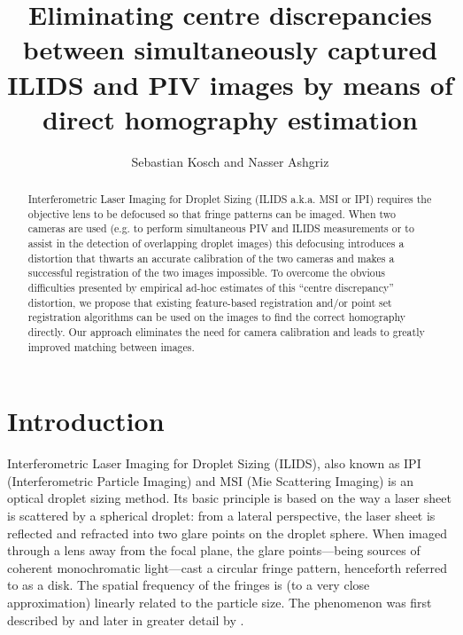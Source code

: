 \documentclass[floatfix,aip,rsi,reprint,graphicx]{revtex4-1}
\begin{document}
 \title{Eliminating centre discrepancies
between simultaneously captured ILIDS and PIV images by means of direct
homography estimation} \author{Sebastian Kosch and Nasser
Ashgriz}  
    \begin{abstract} Interferometric Laser Imaging for Droplet Sizing (ILIDS
        a.k.a. MSI or IPI) requires the objective lens to be defocused so that
        fringe patterns can be imaged. When two cameras are used (e.g. to
        perform simultaneous PIV and ILIDS measurements or to assist in the
        detection of overlapping droplet images) this defocusing introduces a
        distortion that thwarts an accurate calibration of the two cameras
        and makes a successful registration of the two images impossible. To
        overcome the obvious difficulties presented by empirical ad-hoc
        estimates of this ``centre discrepancy'' distortion, we propose that
        existing feature-based registration and/or point set registration
        algorithms can be used on the images to find the correct homography
        directly. Our approach eliminates the need for camera calibration and
        leads to greatly improved matching between images.
\end{abstract} \maketitle

\section{Introduction} Interferometric Laser Imaging for Droplet Sizing (ILIDS),
also known as IPI (Interferometric Particle Imaging) and MSI (Mie Scattering
Imaging) is an optical droplet sizing method. Its basic principle is based on
the way a laser sheet is scattered by a spherical droplet: from a lateral
perspective, the laser sheet is reflected and refracted into two glare points on
the droplet sphere. When imaged through a lens away from the focal plane, the
glare points---being sources of coherent monochromatic light---cast a circular
fringe pattern, henceforth referred to as a disk. The spatial frequency of the
fringes is (to a very close approximation) linearly related to the particle
size. The phenomenon was first described by \citet{Konig86} and later in greater
detail by \citet{Glover95}.
\end{document}
